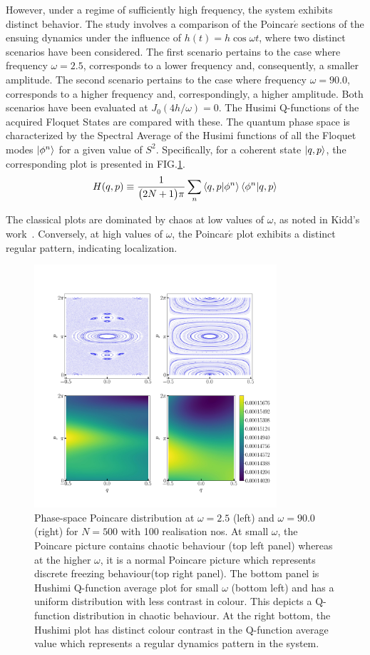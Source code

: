 \documentclass[%
reprint,
superscriptaddress,
amsmath,amssymb,
aps,
prb,
showkeys,
]{revtex4-2}
\begin{document}
	However, under a regime of sufficiently high frequency, the system exhibits distinct behavior. The study involves a comparison of the Poincar$\acute{e}$ sections of the ensuing dynamics under the influence of $h(t)=h\cos{\omega t}$, where two distinct scenarios have been considered. The first scenario pertains to the case where frequency $\omega=2.5$, corresponds to a lower frequency and, consequently, a smaller amplitude. The second scenario pertains to the case where frequency $\omega=90.0$,  corresponds to a higher frequency and, correspondingly, a higher amplitude. Both scenarios have been evaluated at $J_0(4h/\omega)=0$. The Husimi Q-functions of the acquired Floquet States are compared with these. The quantum phase space is characterized by the Spectral Average of the Husimi functions of all the Floquet modes $\ket{\phi^n}$ for a given value of $S^2$. Specifically, for a coherent state $\ket{q,p}$, the corresponding plot is presented in FIG.\ref{fig:classical_lipkin}.
	\begin{equation*}
		H(q,p)\equiv \frac{1}{\big(2N+1\big)\pi}\sum_n \ip{q,p}{\phi^n}\ip{\phi^n}{q,p}
	\end{equation*}
	
	The classical plots are dominated by chaos at low values of $\omega$, as noted in Kidd's work~\cite{Kidd2019}. Conversely, at high values of $\omega$, the Poincar$\acute{e}$ plot exhibits a distinct regular pattern, indicating localization.
	\begin{figure}[ht!]
		\centering
		\includegraphics[height = 9.0cm, width = 9.0 cm]{lmg_poincare.jpeg}
		\caption{Phase-space Poincare distribution at $\omega = 2.5$ (left) and $\omega = 90.0$ (right) for $N=500$ with 100 realisation nos. At small $\omega$, the Poincare picture contains chaotic behaviour (top left panel) whereas at the higher $\omega$, it is a normal Poincare picture which represents discrete freezing behaviour(top right panel). The bottom panel is Hushimi Q-function average plot for small $\omega$ (bottom left) and has a uniform distribution with less contrast in colour. This depicts a Q-function distribution in chaotic behaviour. At the right bottom, the Hushimi plot has distinct colour contrast in the Q-function average value which represents a regular dynamics pattern in the system.}
		\label{fig:classical_lipkin}
	\end{figure}
\end{document}
